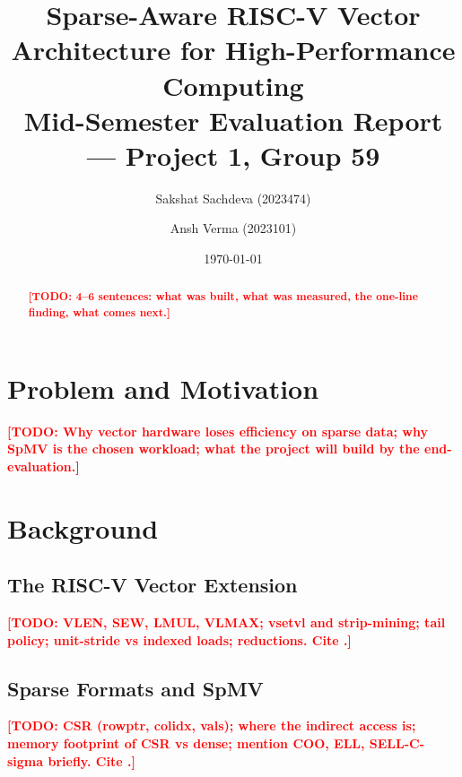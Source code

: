 \documentclass[11pt,a4paper]{article}
\title{Sparse-Aware RISC-V Vector Architecture for High-Performance Computing\\
\large Mid-Semester Evaluation Report --- Project 1, Group 59}
\author{Sakshat Sachdeva (2023474) \and Ansh Verma (2023101)}
\date{\today}
\newcommand{\todo}[1]{\textcolor{red}{\textbf{[TODO: #1]}}}
\begin{document}
\maketitle

\begin{abstract}
\todo{4--6 sentences: what was built, what was measured, the one-line finding, what comes next.}
\end{abstract}

\section{Problem and Motivation}
\todo{Why vector hardware loses efficiency on sparse data; why SpMV is the chosen workload; what the project will build by the end-evaluation.}

\section{Background}
\subsection{The RISC-V Vector Extension}
\todo{VLEN, SEW, LMUL, VLMAX; vsetvl and strip-mining; tail policy; unit-stride vs indexed loads; reductions. Cite \cite{rvvspec}.}

\subsection{Sparse Formats and SpMV}
\todo{CSR (rowptr, colidx, vals); where the indirect access is; memory footprint of CSR vs dense; mention COO, ELL, SELL-C-sigma briefly. Cite \cite{bell2009spmv,kreutzer2014sell}.}
\end{document}
